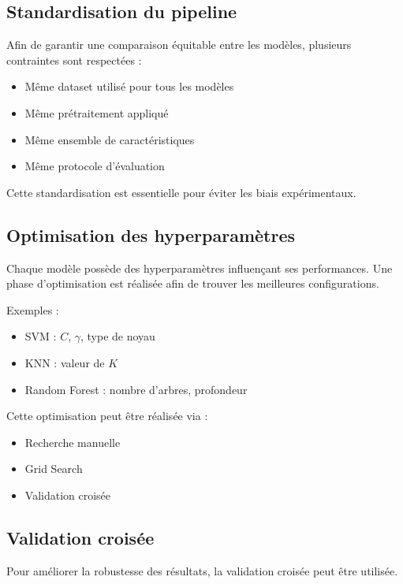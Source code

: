 \documentclass[12pt,a4paper]{article}
\begin{document}
    \subsection{Standardisation du pipeline}

    Afin de garantir une comparaison équitable entre les modèles, plusieurs contraintes sont respectées :
    \begin{itemize}
        \item Même dataset utilisé pour tous les modèles
        \item Même prétraitement appliqué
        \item Même ensemble de caractéristiques
        \item Même protocole d’évaluation
    \end{itemize}

    Cette standardisation est essentielle pour éviter les biais expérimentaux.

    \subsection{Optimisation des hyperparamètres}

    Chaque modèle possède des hyperparamètres influençant ses performances.
    Une phase d’optimisation est réalisée afin de trouver les meilleures configurations.

    Exemples :
    \begin{itemize}
        \item SVM : \(C\), \(\gamma\), type de noyau
        \item KNN : valeur de \(K\)
        \item Random Forest : nombre d’arbres, profondeur
    \end{itemize}

    Cette optimisation peut être réalisée via :
    \begin{itemize}
        \item Recherche manuelle
        \item Grid Search
        \item Validation croisée
    \end{itemize}

    \subsection{Validation croisée}

    Pour améliorer la robustesse des résultats, la validation croisée peut être utilisée.
\end{document}

